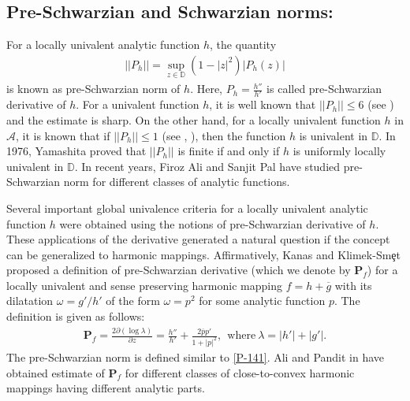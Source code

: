 \documentclass[a4paper,12pt]{amsart}
\theoremstyle{definition}
\newcounter {own}
\begin{document}
	

	
	\subsection{Pre-Schwarzian and Schwarzian norms:}
	For a locally univalent analytic function $h$, the quantity 
	\begin{align}\label{P-141}
	||P_h|| = \sup_{z \in \mathbb{D}}(1-|z|^2)|P_h(z)|
	\end{align}
	is known as pre-Schwarzian norm of $h.$ Here, $P_h=\frac{h''}{h'}$ is called pre-Schwarzian derivative of $h.$ For a univalent function $h$, it is well known that $||P_h||\leq 6$ (see \cite{Kraus-1932}) and the estimate is sharp. On the other hand, for a locally univalent function $h$ in $\mathcal{A}$, it is known that if $||P_h||\leq 1$ (see \cite{Becker-1972}, \cite{Becker-Pommerenke-1984}), then the function $h$ is univalent in $\mathbb{D}$. In 1976, Yamashita \cite{Yamashita-1976} proved that $||P_h||$ is finite if and only if $h$ is uniformly locally univalent in $\mathbb{D}.$ In recent years, Firoz Ali and Sanjit Pal \cite{Ali-Pal-2023, Ali-Pal--2023, Ali-Pal---2023, Ali-Pal-2024} have studied pre-Schwarzian norm for different classes of analytic functions. 
	
	Several important global univalence criteria for a locally univalent analytic function $h$ were obtained using the notions of pre-Schwarzian derivative of $h$. These applications of the derivative generated a natural question if the concept can be generalized to harmonic mappings. Affirmatively, Kanas and Klimek-Sm\c{e}t \cite{Kanas-Smet-2014} proposed a definition of pre-Schwarzian derivative (which we denote by $\mathbf{P}_f$) for a locally univalent and sense preserving harmonic mapping $f = h+\overline{g}$ with its dilatation $\omega = g'/h'$ of the form $\omega = p^2$ for some analytic function $p$. The definition is given as follows:
	\begin{align}\label{p1-020}
		\mathbf{P}_f= \frac{2\partial(\log\lambda)}{\partial z}= \frac{h''}{h'}+\frac{2\overline{p}p'}{1+|p|^2},~~\text{where}~\lambda = |h'|+|g'|.
	\end{align}
	The pre-Schwarzian norm is defined similar to \eqref{P-141}. Ali and Pandit in \cite{Ali-Pandit-2023} have obtained estimate of $\mathbf{P}_f$ for different classes of close-to-convex harmonic mappings having different analytic parts. 
	
\end{document}
